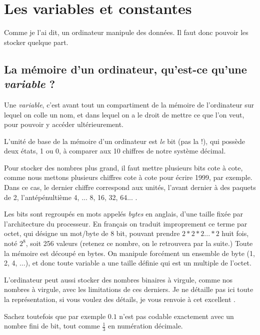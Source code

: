 \chapter{Les variables et constantes}
Comme je l'ai dit, un ordinateur manipule des données.
Il faut donc pouvoir les stocker quelque part.
\section{La mémoire d'un ordinateur, qu'est-ce qu'une \emph{variable} ?}
Une \emph{variable},
c'est avant tout un compartiment de la mémoire de l'ordinateur 
sur lequel on colle un nom,
et dans lequel on a le droit de mettre ce que l'on veut,
pour pouvoir y accéder ultérieurement.

L'unité de base de la mémoire d'un ordinateur est \emph{le} bit (pas la !),
qui possède deux états, 1 ou 0,
à comparer aux 10 chiffres de notre système décimal.

Pour stocker des nombres
plus grand, il faut mettre plusieurs bits cote à cote,
comme nous mettons plusieurs chiffres cote à cote pour écrire 1999, par exemple.
Dans ce cas, le dernier chiffre correspond aux unités, l'avant dernier à
des paquets de 2, l'antépénultième 4, ... 8, 16, 32, 64... .

Les bits sont regroupés en mots appelés \emph{bytes} en anglais,
d'une taille fixée par l'architecture du processeur.
En français on traduit improprement ce terme par octet,
qui désigne un mot/byte de 8 bit, pouvant prendre
\begin{math}2*2*2...*2\end{math} huit fois, noté \begin{math} 2^{8} \end{math},
soit 256 valeurs (retenez ce nombre, on le retrouvera par la suite.)
Toute la mémoire est découpé en bytes.
On manipule forcément un ensemble de byte (1, 2, 4, ...),
et donc toute variable a une taille définie qui est un multiple de l'octet.

L'ordinateur peut aussi stocker des nombres binaires à virgule,
comme nos nombres à virgule, avec les limitations de ces derniers.
Je ne détaille pas ici toute la représentation, si vous voulez des détails,
je vous renvoie à cet excellent .

Sachez toutefois que
par exemple
$0.1$ n'est pas codable exactement avec un nombre fini de bit,
tout comme \(\frac{1}{3}\) en numération décimale.


